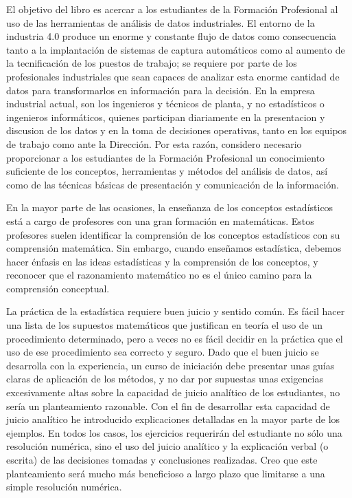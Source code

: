 \documentclass[
  letterpaper,
]{scrbook}
\begin{document}
El objetivo del libro es acercar a los estudiantes de la Formación
Profesional al uso de las herramientas de análisis de datos
industriales. El entorno de la industria 4.0 produce un enorme y
constante flujo de datos como consecuencia tanto a la implantación de
sistemas de captura automáticos como al aumento de la tecnificación de
los puestos de trabajo; se requiere por parte de los profesionales
industriales que sean capaces de analizar esta enorme cantidad de datos
para transformarlos en información para la decisión. En la empresa
industrial actual, son los ingenieros y técnicos de planta, y no
estadísticos o ingenieros informáticos, quienes participan diariamente
en la presentacion y discusion de los datos y en la toma de decisiones
operativas, tanto en los equipos de trabajo como ante la Dirección. Por
esta razón, considero necesario proporcionar a los estudiantes de la
Formación Profesional un conocimiento suficiente de los conceptos,
herramientas y métodos del análisis de datos, así como de las técnicas
básicas de presentación y comunicación de la información.

En la mayor parte de las ocasiones, la enseñanza de los conceptos
estadísticos está a cargo de profesores con una gran formación en
matemáticas. Estos profesores suelen identificar la comprensión de los
conceptos estadísticos con su comprensión matemática. Sin embargo,
cuando enseñamos estadística, debemos hacer énfasis en las ideas
estadísticas y la comprensión de los conceptos, y reconocer que el
razonamiento matemático no es el único camino para la comprensión
conceptual.

La práctica de la estadística requiere buen juicio y sentido común. Es
fácil hacer una lista de los supuestos matemáticos que justifican en
teoría el uso de un procedimiento determinado, pero a veces no es fácil
decidir en la práctica que el uso de ese procedimiento sea correcto y
seguro. Dado que el buen juicio se desarrolla con la experiencia, un
curso de iniciación debe presentar unas guías claras de aplicación de
los métodos, y no dar por supuestas unas exigencias excesivamente altas
sobre la capacidad de juicio analítico de los estudiantes, no sería un
planteamiento razonable. Con el fin de desarrollar esta capacidad de
juicio analítico he introducido explicaciones detalladas en la mayor
parte de los ejemplos. En todos los casos, los ejercicios requerirán del
estudiante no sólo una resolución numérica, sino el uso del juicio
analítico y la explicación verbal (o escrita) de las decisiones tomadas
y conclusiones realizadas. Creo que este planteamiento será mucho más
beneficioso a largo plazo que limitarse a una simple resolución
numérica.
\end{document}
